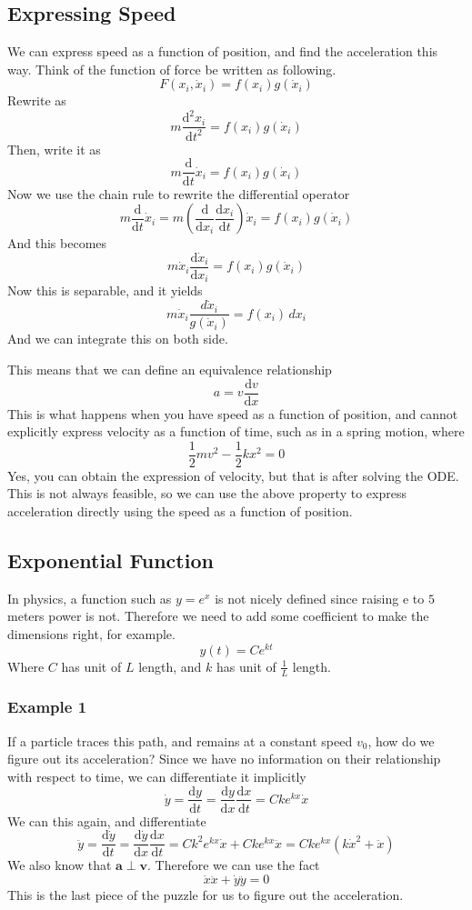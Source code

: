 \documentclass[12pt]{article}
\newcommand{\dydx}[2]{\frac{\text{d} #1}{\text{d} #2}}
\newcommand{\paren}[1]{\left( #1 \right)}
\begin{document}
\subsection{Expressing Speed}
We can express speed as a function of position, and find the acceleration this way. Think of the function of force be written as following. 
    \[
    F(x_i, \dot{x}_i) = f(x_i) g(\dot{x}_i)
    \]
            Rewrite as
            \[
            m\dydx{^2x_i}{t^2} = f(x_i) g(\dot{x}_i)
            \]
            Then, write it as
            \[
            m\dydx{}{t}\dot{x}_i = f(x_i) g(\dot{x}_i)
            \]
            Now we use the chain rule to rewrite the differential operator
            \[
            m\dydx{}{t}\dot{x}_i  = m\paren{\dydx{}{x_i}\dydx{x_i}{t} }\dot{x}_i= f(x_i) g(\dot{x}_i)
            \]
            And this becomes
            \[
            m\dot{x}_i\dydx{\dot{x}_i}{x_i} = f(x_i) g(\dot{x}_i)
            \]
            Now this is separable, and it yields
            \[
            m\dot{x}_i\frac{d\dot{x}_i}{g(\dot{x}_i)} = f(x_i)\,dx_i
            \]
            And we can integrate this on both side. 

    This means that we can define an equivalence relationship
    \[
    a = v\dydx{v}{x}
    \]
    This is what happens when you have speed as a function of position, and cannot explicitly express velocity as a function of time, such as in a spring motion, where
    \[
    \frac{1}{2}mv^2 - \frac{1}{2}kx^2 = 0
    \]
    Yes, you can obtain the expression of velocity, but that is after solving the ODE. This is not always feasible, so we can use the above property to express acceleration directly using the speed as a function of position. 

\subsection{Exponential Function}
    In physics, a function such as $y = e^{x}$ is not nicely defined since raising e to $5$ meters power is not. Therefore we need to add some coefficient to make the dimensions right, for example.
    \[
    y(t) = Ce^{kt}
    \]
    Where $C$ has unit of $L$ length, and $k$ has unit of $\frac{1}{L}$ length.
    \subsubsection{Example 1}
    If a particle traces this path, and remains at a constant speed $v_0$, how do we figure out its acceleration? Since we have no information on their relationship with respect to time, we can differentiate it implicitly
    \[
    \dot{y} = \dydx{y}{t} = \dydx{y}{x}\dydx{x}{t} = Cke^{kx}\dot{x}
    \]
    We can this again, and differentiate
    \[
    \ddot{y} = \dydx{\dot{y}}{t} = \dydx{\dot{y}}{x}\dydx{x}{t} = Ck^2e^{kx}\dot{x} + Cke^{kx}\ddot{x} = Cke^{kx}\paren{k\dot{x}^2+\ddot{x}}
    \]
    We also know that $\mathbf{a}\perp\mathbf{v}$. Therefore we can use the fact 
    \[
    \dot{x}\ddot{x}+\dot{y}\ddot{y} = 0
    \]
    This is the last piece of the puzzle for us to figure out the acceleration. 
\end{document}
